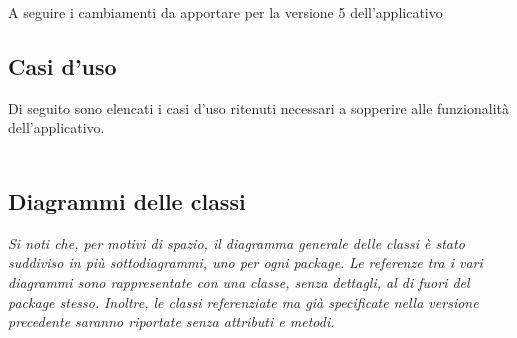 A seguire i cambiamenti da apportare per la versione 5 dell'applicativo

\subsection{Casi d'uso}
Di seguito sono elencati i casi d'uso ritenuti necessari a sopperire alle funzionalità
dell'applicativo.
\\\\


\pagebreak


\pagebreak
\subsection{Diagrammi delle classi}

\textit{Si noti che, per motivi di spazio, il diagramma generale delle classi è stato suddiviso in più sottodiagrammi, uno per ogni package.}
\textit{Le referenze tra i vari diagrammi sono rappresentate con una classe, senza dettagli, al di fuori del package stesso.}
\textit{Inoltre, le classi referenziate ma già specificate nella versione precedente saranno riportate senza attributi e metodi.}


